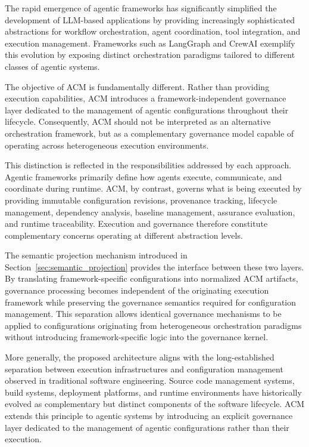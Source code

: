 \documentclass[10pt]{article}
\begin{document}
The rapid emergence of agentic frameworks has significantly simplified the development of LLM-based applications by providing increasingly sophisticated abstractions for workflow orchestration, agent coordination, tool integration, and execution management. Frameworks such as LangGraph and CrewAI exemplify this evolution by exposing distinct orchestration paradigms tailored to different classes of agentic systems.

The objective of ACM is fundamentally different. Rather than providing execution capabilities, ACM introduces a framework-independent governance layer dedicated to the management of agentic configurations throughout their lifecycle. Consequently, ACM should not be interpreted as an alternative orchestration framework, but as a complementary governance model capable of operating across heterogeneous execution environments.

This distinction is reflected in the responsibilities addressed by each approach. Agentic frameworks primarily define how agents execute, communicate, and coordinate during runtime. ACM, by contrast, governs what is being executed by providing immutable configuration revisions, provenance tracking, lifecycle management, dependency analysis, baseline management, assurance evaluation, and runtime traceability. Execution and governance therefore constitute complementary concerns operating at different abstraction levels.

The semantic projection mechanism introduced in Section~\ref{sec:semantic_projection} provides the interface between these two layers. By translating framework-specific configurations into normalized ACM artifacts, governance processing becomes independent of the originating execution framework while preserving the governance semantics required for configuration management. This separation allows identical governance mechanisms to be applied to configurations originating from heterogeneous orchestration paradigms without introducing framework-specific logic into the governance kernel.

More generally, the proposed architecture aligns with the long-established separation between execution infrastructures and configuration management observed in traditional software engineering. Source code management systems, build systems, deployment platforms, and runtime environments have historically evolved as complementary but distinct components of the software lifecycle. ACM extends this principle to agentic systems by introducing an explicit governance layer dedicated to the management of agentic configurations rather than their execution.
\end{document}
